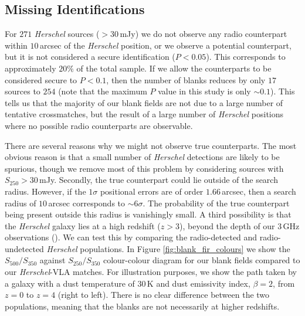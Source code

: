 \subsection{Missing Identifications}

For $271$ \textit{Herschel} sources ($> 30\,$mJy) we do not observe any radio counterpart within $10\,$arcsec of the \textit{Herschel} position, or we observe a potential counterpart, but it is not considered a secure identification ($P < 0.05$). This corresponds to approximately $20\%$ of the total sample. If we allow the counterparts to be considered secure to $P < 0.1$, then the number of blanks reduces by only $17$ sources to $254$ (note that the maximum $P$ value in this study is only $\sim 0.1$). This tells us that the majority of our blank fields are not due to a large number of tentative crossmatches, but the result of a large number of \textit{Herschel} positions where no possible radio counterparts are observable.

There are several reasons why we might not observe true counterparts. The most obvious reason is that a small number of \textit{Herschel} detections are likely to be spurious, though we remove most of this problem by considering sources with $S_{250} > 30\,$mJy. Secondly, the true counterpart could lie outside of the search radius. However, if the $1\sigma$ positional errors are of order $1.66\,$arcsec, then a search radius of $10\,$arcsec corresponds to $\sim 6\sigma$. The probability of the true counterpart being present outside this radius is vanishingly small. A third possibility is that the \textit{Herschel} galaxy lies at a high redshift ($z > 3$), beyond the depth of our $3\,$GHz observations (\citealt{Eales_2003}). We can test this by comparing the radio-detected and radio-undetected \textit{Herschel} populations. In Figure \ref{fig:blank_fir_colours} we show the $S_{500}/S_{350}$ against $S_{250}/S_{350}$ colour-colour diagram for our blank fields compared to our \textit{Herschel}-VLA matches. For illustration purposes, we show the path taken by a galaxy with a dust temperature of $30\,$K and dust emissivity index, $\beta = 2$, from $z = 0$ to $z = 4$ (right to left). There is no clear difference between the two populations, meaning that the blanks are not necessarily at higher redshifts.


